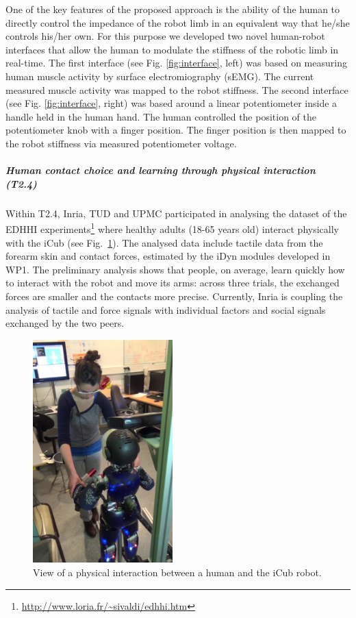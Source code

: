 One of the key features of the proposed approach is the ability of the human to directly control the impedance of the robot limb in an equivalent way that he/she controls his/her own. For this purpose we developed two novel human-robot interfaces \cite{Peternel2014,Peternel2015} that allow the human to modulate the stiffness of the robotic limb in real-time. The first interface (see Fig. \ref{fig:interface}, left) was based on measuring human muscle activity by surface electromiography (sEMG). The current measured muscle activity was mapped to the robot stiffness. The second interface (see Fig. \ref{fig:interface}, right) was based around a linear potentiometer inside a handle held in the human hand. The human controlled the position of the potentiometer knob with a finger position. The finger position is then mapped to the robot stiffness via measured potentiometer voltage.








\subparagraph{Human contact choice and learning through physical interaction (T2.4)}

Within T2.4, Inria, TUD and UPMC participated in analysing the dataset of the EDHHI experiments\footnote{\url{http://www.loria.fr/~sivaldi/edhhi.htm}} where healthy adults (18-65 years old) interact physically with the iCub (see  Fig.~\ref{fig:eddhi_picture}). The analysed data include tactile data from the forearm skin and contact forces, estimated by the iDyn modules developed in WP1. The preliminary analysis shows that people, on average, learn quickly how to interact with the robot and move its arms: across three trials, the exchanged forces are smaller and the contacts more precise. Currently, Inria is coupling the analysis of tactile and force signals with individual factors and social signals exchanged by the two peers.

\begin{figure}[!t]
  \centering
  \includegraphics[width=0.48\textwidth]{images/eddhi_illustration.png}
  \caption{View of a physical interaction between a human and the iCub robot.}
  \label{fig:eddhi_picture}
\end{figure}

